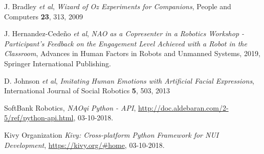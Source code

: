 \documentclass{article}
\begin{document}
\begin{thebibliography}{5}
 J. Bradley \textit{et al}, {\em Wizard of Oz Experiments for Companions}, People and Computers {\bf 23}, 313, 2009

 J. Hernandez-Cedeño \textit{et al}, {\em NAO as a Copresenter in a Robotics Workshop - Participant’s Feedback on the Engagement Level Achieved with a Robot in the Classroom}, Advances in Human Factors in Robots and Unmanned Systems, 2019, Springer International Publishing.

 D. Johnson \textit{et al}, {\em Imitating Human Emotions with Artificial Facial Expressions}, International Journal of Social Robotics {\bf 5}, 503, 2013

 SoftBank Robotics, {\em NAOqi Python - API},  \url{http://doc.aldebaran.com/2-5/ref/python-api.html}, 03-10-2018.

 Kivy Organization {\em Kivy: Cross-platform Python Framework for NUI Development}, \url{https://kivy.org/#home}, 03-10-2018.

\end{thebibliography}
\end{document}
